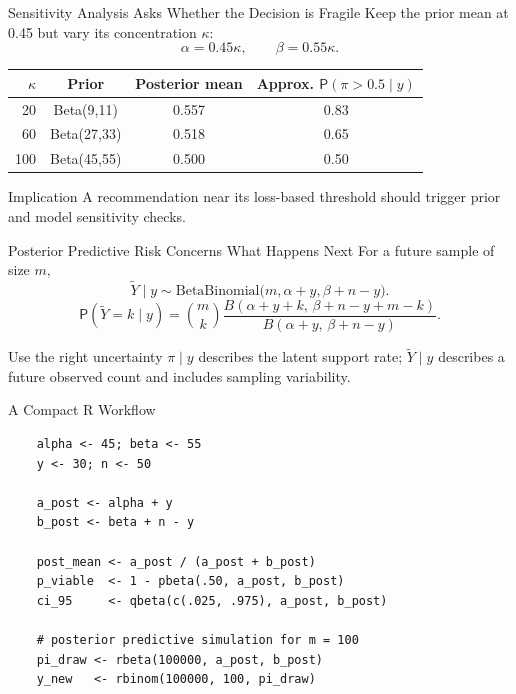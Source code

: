 \documentclass[aspectratio=43,11pt]{beamer}
\newcommand{\prob}{\mathsf{P}}
\begin{document}
{  %
  \begin{frame}{Sensitivity Analysis Asks Whether the Decision is Fragile}
    Keep the prior mean at 0.45 but vary its concentration $\kappa$:
    \[
    \alpha=0.45\kappa,\qquad\beta=0.55\kappa.
    \]
    \begin{center}
      \begin{tabular}{rccc}
        \toprule
        $\kappa$ & Prior & Posterior mean & Approx. $\prob(\pi>0.5\mid y)$\\
        \midrule
        20 & Beta(9,11) & 0.557 & 0.83\\
        60 & Beta(27,33) & 0.518 & 0.65\\
        100 & Beta(45,55) & 0.500 & 0.50\\
        \bottomrule
      \end{tabular}
    \end{center}
    \begin{block}{Implication}
      A recommendation near its loss-based threshold should trigger prior and model sensitivity checks.
    \end{block}
  \end{frame}
}

\begin{frame}{Posterior Predictive Risk Concerns What Happens Next}
  For a future sample of size $m$,
  \[
  \tilde Y\mid y\sim\mathrm{BetaBinomial}
  \bigl(m,\alpha+y,\beta+n-y\bigr).
  \]
  \[
  \prob(\tilde Y=k\mid y)=\binom{m}{k}
  \frac{B(\alpha+y+k,\,\beta+n-y+m-k)}
  {B(\alpha+y,\,\beta+n-y)}.
  \]
  \begin{block}{Use the right uncertainty}
    $\pi\mid y$ describes the latent support rate; $\tilde Y\mid y$ describes a future observed count and includes sampling variability.
  \end{block}
\end{frame}

\begin{frame}[fragile]{A Compact R Workflow}
  \begin{verbatim}
    alpha <- 45; beta <- 55
    y <- 30; n <- 50
    
    a_post <- alpha + y
    b_post <- beta + n - y
    
    post_mean <- a_post / (a_post + b_post)
    p_viable  <- 1 - pbeta(.50, a_post, b_post)
    ci_95     <- qbeta(c(.025, .975), a_post, b_post)
    
    # posterior predictive simulation for m = 100
    pi_draw <- rbeta(100000, a_post, b_post)
    y_new   <- rbinom(100000, 100, pi_draw)
  \end{verbatim}
\end{frame}
\end{document}
